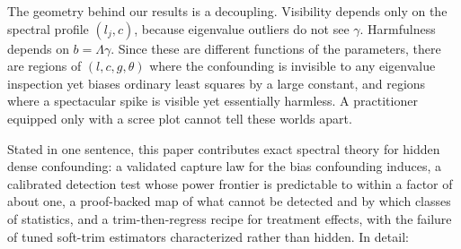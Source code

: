 The geometry behind our results is a decoupling. Visibility depends only on the spectral profile $(l_j, c)$, because eigenvalue outliers do not see $\gamma$. Harmfulness depends on $b = \Lambda\gamma$. Since these are different functions of the parameters, there are regions of $(l, c, g, \theta)$ where the confounding is invisible to any eigenvalue inspection yet biases ordinary least squares by a large constant, and regions where a spectacular spike is visible yet essentially harmless. A practitioner equipped only with a scree plot cannot tell these worlds apart.

Stated in one sentence, this paper contributes exact spectral theory for hidden dense confounding: a validated capture law for the bias confounding induces, a calibrated detection test whose power frontier is predictable to within a factor of about one, a proof-backed map of what cannot be detected and by which classes of statistics, and a trim-then-regress recipe for treatment effects, with the failure of tuned soft-trim estimators characterized rather than hidden. In detail:

